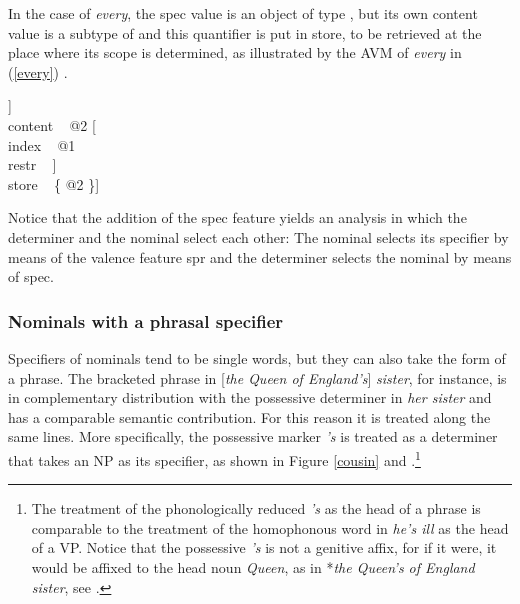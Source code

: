 \documentclass[output=paper]{langsci/langscibook}
\begin{document}
\noindent
In the case of \emph{every}, the {\sc spec} value is an object of 
type , but its own {\sc content} value is a subtype of 
 and this quantifier is put in store, to be retrieved 
at the place where its scope is determined, as illustrated by the AVM
of \emph{every} in (\ref{every}) \citep[204]{GS00}.  

\begin{exe} 
\ex\label{every} 
\begin{avm}
[cat|head [\type{det}               \\
           spec [\type{parameter}   \\
                 index ~ @1          \\
                 restr ~ \avmbox{$\Sigma$} ]] \\
 content ~ @2 [     \\
               index ~ @1            \\
               restr ~ \avmbox{$\Sigma$} ] \\
 store ~ \{ @2 \}]
\end{avm}
\end{exe}

\noindent 
Notice that the addition of the {\sc spec} feature yields an analysis in which the determiner 
and the nominal select each other: The nominal selects 
its specifier by means of the valence feature {\sc spr} and the determiner selects the nominal 
by means of {\sc spec}.  


\subsubsection{Nominals with a phrasal specifier} 


Specifiers of nominals tend to be single words, but they can also take the form 
of a phrase. The bracketed phrase in [\emph{the Queen of England's}] \emph{sister},
for instance, is in complementary distribution with the possessive
determiner in \emph{her sister} and has a comparable semantic contribution.   
For this reason it is treated along the same lines. More specifically, the 
possessive marker \emph{'s} is treated as a determiner that takes an NP as its specifier, 
as shown in Figure \ref{cousin} \citep[51--54]{ps2} and \citep[193]{GS00}.\footnote{The treatment 
of the phonologically reduced \emph{'s} as the head of a phrase is comparable to 
the treatment of the homophonous word in \emph{he's ill} as the head of a VP.
Notice that the possessive \emph{'s} is not a genitive affix, for if it were, it 
would be affixed to the head noun \emph{Queen}, as in *\emph{the Queen's of England sister}, see  
\citet[199]{SagWasow03}.}
\end{document}
